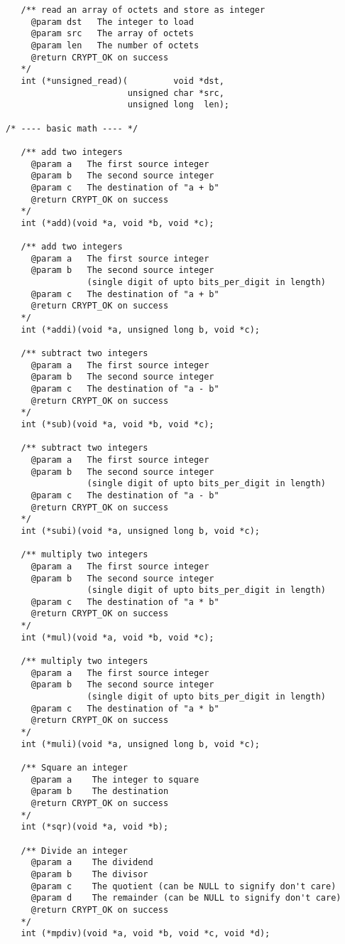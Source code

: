 \documentclass[synpaper]{book}
\begin{document}
\begin{small}
\begin{verbatim}
   /** read an array of octets and store as integer
     @param dst   The integer to load
     @param src   The array of octets
     @param len   The number of octets
     @return CRYPT_OK on success
   */
   int (*unsigned_read)(         void *dst,
                        unsigned char *src,
                        unsigned long  len);

/* ---- basic math ---- */

   /** add two integers
     @param a   The first source integer
     @param b   The second source integer
     @param c   The destination of "a + b"
     @return CRYPT_OK on success
   */
   int (*add)(void *a, void *b, void *c);

   /** add two integers
     @param a   The first source integer
     @param b   The second source integer
                (single digit of upto bits_per_digit in length)
     @param c   The destination of "a + b"
     @return CRYPT_OK on success
   */
   int (*addi)(void *a, unsigned long b, void *c);

   /** subtract two integers
     @param a   The first source integer
     @param b   The second source integer
     @param c   The destination of "a - b"
     @return CRYPT_OK on success
   */
   int (*sub)(void *a, void *b, void *c);

   /** subtract two integers
     @param a   The first source integer
     @param b   The second source integer
                (single digit of upto bits_per_digit in length)
     @param c   The destination of "a - b"
     @return CRYPT_OK on success
   */
   int (*subi)(void *a, unsigned long b, void *c);

   /** multiply two integers
     @param a   The first source integer
     @param b   The second source integer
                (single digit of upto bits_per_digit in length)
     @param c   The destination of "a * b"
     @return CRYPT_OK on success
   */
   int (*mul)(void *a, void *b, void *c);

   /** multiply two integers
     @param a   The first source integer
     @param b   The second source integer
                (single digit of upto bits_per_digit in length)
     @param c   The destination of "a * b"
     @return CRYPT_OK on success
   */
   int (*muli)(void *a, unsigned long b, void *c);

   /** Square an integer
     @param a    The integer to square
     @param b    The destination
     @return CRYPT_OK on success
   */
   int (*sqr)(void *a, void *b);

   /** Divide an integer
     @param a    The dividend
     @param b    The divisor
     @param c    The quotient (can be NULL to signify don't care)
     @param d    The remainder (can be NULL to signify don't care)
     @return CRYPT_OK on success
   */
   int (*mpdiv)(void *a, void *b, void *c, void *d);


\end{verbatim}
\end{small}
\end{document}
